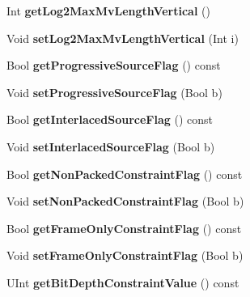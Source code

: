 \begin{DoxyCompactItemize}
\item 
\mbox{\label{class_t_enc_cfg_a4bf4d32aa73c8dee9bdd151edf4a87e0}} 
Int {\bfseries get\+Log2\+Max\+Mv\+Length\+Vertical} ()
\item 
\mbox{\label{class_t_enc_cfg_a61c2f5fb28efc388d071175b62ef2c5f}} 
Void {\bfseries set\+Log2\+Max\+Mv\+Length\+Vertical} (Int i)
\item 
\mbox{\label{class_t_enc_cfg_adf1499a2f052d17344855a653b9f0ffd}} 
Bool {\bfseries get\+Progressive\+Source\+Flag} () const
\item 
\mbox{\label{class_t_enc_cfg_afb776574466c98284f4bf66dac166932}} 
Void {\bfseries set\+Progressive\+Source\+Flag} (Bool b)
\item 
\mbox{\label{class_t_enc_cfg_aad7994b4a68fab905949dddc462de51b}} 
Bool {\bfseries get\+Interlaced\+Source\+Flag} () const
\item 
\mbox{\label{class_t_enc_cfg_a60c647bcb825b90bda9b436c6605af70}} 
Void {\bfseries set\+Interlaced\+Source\+Flag} (Bool b)
\item 
\mbox{\label{class_t_enc_cfg_a840cb231429e4632b4528960dec7306b}} 
Bool {\bfseries get\+Non\+Packed\+Constraint\+Flag} () const
\item 
\mbox{\label{class_t_enc_cfg_a3561f09f514e2b91016edfb548073ffb}} 
Void {\bfseries set\+Non\+Packed\+Constraint\+Flag} (Bool b)
\item 
\mbox{\label{class_t_enc_cfg_af6fe81269ad0c75ed5c5ccdabe0ff7f2}} 
Bool {\bfseries get\+Frame\+Only\+Constraint\+Flag} () const
\item 
\mbox{\label{class_t_enc_cfg_a5ad754d4258008d5a21783ad1d454e51}} 
Void {\bfseries set\+Frame\+Only\+Constraint\+Flag} (Bool b)
\item 
\mbox{\label{class_t_enc_cfg_acc728aac24d1218db0231c42e44be124}} 
U\+Int {\bfseries get\+Bit\+Depth\+Constraint\+Value} () const
\item 

\end{DoxyCompactItemize}
